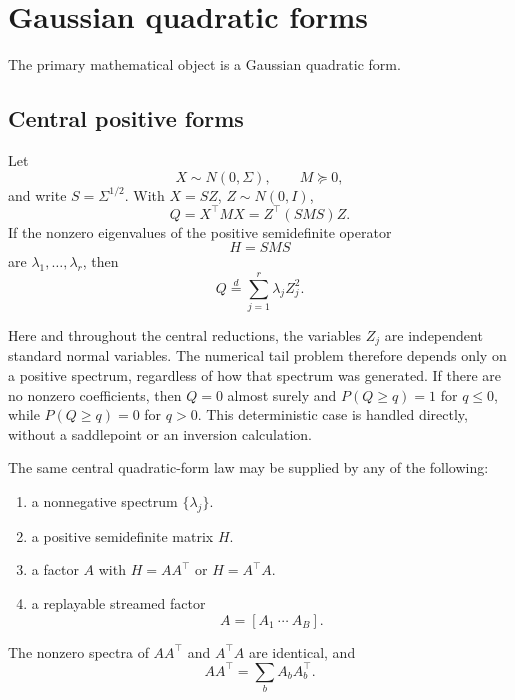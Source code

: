 \chapter{Gaussian quadratic forms}\label{ch:gaussian}
\label{sec:gaussian-core}

The primary mathematical object is a Gaussian quadratic form.

\section{Central positive forms}

Let
\[
X\sim N(0,\Sigma),
\qquad
M\succeq0,
\]
and write \(S=\Sigma^{1/2}\).  With \(X=SZ\), \(Z\sim N(0,I)\),
\[
Q=X^\top MX
=
Z^\top(SMS)Z.
\]
If the nonzero eigenvalues of the positive semidefinite operator
\[
H=SMS
\]
are \(\lambda_1,\ldots,\lambda_r\), then
\[
\boxed{
Q\overset d=
\sum_{j=1}^r\lambda_jZ_j^2.
}
\]

Here and throughout the central reductions, the variables $Z_j$ are independent
standard normal variables. The numerical tail problem therefore depends only
on a positive spectrum, regardless of how that spectrum was generated.
If there are no nonzero coefficients, then $Q=0$ almost surely and
$P(Q\ge q)=1$ for $q\le0$, while $P(Q\ge q)=0$ for $q>0$.
This deterministic case is handled directly, without a saddlepoint or an
inversion calculation.

\begin{proposition}\label{claim:final-2-1}
The same central quadratic-form law may be supplied by any of the following:
\begin{enumerate}
\item a nonnegative spectrum \(\{\lambda_j\}\).
\item a positive semidefinite matrix \(H\).
\item a factor \(A\) with \(H=AA^\top\) or \(H=A^\top A\).
\item a replayable streamed factor
\[
A=[A_1\ \cdots\ A_B].
\]
\end{enumerate}
The nonzero spectra of \(AA^\top\) and \(A^\top A\) are identical, and
\[
AA^\top=\sum_bA_bA_b^\top.
\]
\end{proposition}

